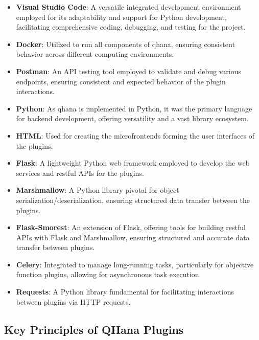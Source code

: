 \documentclass[
  a4paper,  %
  twoside,  %
  bibliography=totoc,
  headsepline,
  cleardoublepage=empty,
  parskip=half,
  draft=false
]{scrbook}
\begin{document}
\begin{itemize}
    \item \textbf{Visual Studio Code}: A versatile integrated development environment employed for its adaptability and support for Python development, facilitating comprehensive coding, debugging, and testing for the project.

    \item \textbf{Docker}: Utilized to run all components of \gls{qhana}, ensuring consistent behavior across different computing environments.

    \item \textbf{Postman}: An API testing tool employed to validate and debug various endpoints, ensuring consistent and expected behavior of the plugin interactions.

    \item \textbf{Python}: As \gls{qhana} is implemented in Python, it was the primary language for backend development, offering versatility and a vast library ecosystem.

    \item \textbf{HTML}: Used for creating the microfrontends forming the user interfaces of the plugins.

    \item \textbf{Flask}: A lightweight Python web framework employed to develop the web services and \gls{rest}ful APIs for the plugins.

    \item \textbf{Marshmallow}: A Python library pivotal for object serialization/deserialization, ensuring structured data transfer between the plugins.

    \item \textbf{Flask-Smorest}: An extension of Flask, offering tools for building \gls{rest}ful APIs with Flask and Marshmallow, ensuring structured and accurate data transfer between plugins.

    \item \textbf{Celery}: Integrated to manage long-running tasks, particularly for objective function plugins, allowing for asynchronous task execution.

    \item \textbf{Requests}: A Python library fundamental for facilitating interactions between plugins via HTTP requests.
\end{itemize}

\subsection{Key Principles of QHana Plugins}
\end{document}

